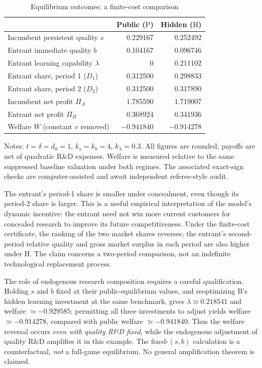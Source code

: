 \documentclass[11pt,a4paper]{article}
\numberwithin{equation}{section}
\theoremstyle{remark}
\newcommand{\PP}{\mathrm{P}}
\newcommand{\HH}{\mathrm{H}}
\newcommand{\kl}{k_{\lambda}}
\begin{document}
\begin{table}[t]
\centering
\begin{threeparttable}
\caption{Equilibrium outcomes: a finite-cost comparison}
\label{tab:benchmark}
\begin{tabular}{lrr}
\toprule
& Public ($\PP$) & Hidden ($\HH$) \\
\midrule
Incumbent persistent quality $s$ & 0.229167 & 0.252492 \\
Entrant immediate quality $b$ & 0.104167 & 0.096746 \\
Entrant learning capability $\lambda$ & 0 & 0.211102 \\
Entrant share, period 1 ($D_1$) & 0.312500 & 0.298833 \\
Entrant share, period 2 ($D_2$) & 0.312500 & 0.317890 \\
Incumbent net profit $\Pi_A$ & 1.785590 & 1.719007 \\
Entrant net profit $\Pi_B$ & 0.368924 & 0.341936 \\
Welfare $W$ (constant $v$ removed) & $-0.941840$ & $-0.914278$ \\
\bottomrule
\end{tabular}
\begin{tablenotes}[flushleft]\footnotesize
\item Notes: $t=\delta=d_0=1$, $k_s=k_b=4$, $\kl=0.3$. All figures are rounded; payoffs are net of quadratic R\&D expenses. Welfare is measured relative to the same suppressed baseline valuation under both regimes. The associated exact-sign checks are computer-assisted and await independent referee-style audit.
\end{tablenotes}
\end{threeparttable}
\end{table}

The entrant's period-1 share is smaller under concealment, even though its period-2 share is larger. This is a useful empirical interpretation of the model's dynamic incentive: the entrant need not win more current customers for concealed research to improve its future competitiveness. Under the finite-cost certificate, the ranking of the two market shares reverses; the entrant's second-period relative quality and gross market surplus in each period are also higher under H. The claim concerns a two-period comparison, not an indefinite technological replacement process.

The role of endogenous research composition requires a careful qualification. Holding $s$ and $b$ fixed at their public-equilibrium values, and reoptimizing B's hidden learning investment at the same benchmark, gives $\lambda\simeq0.218541$ and welfare $\simeq-0.929585$; permitting all three investments to adjust yields welfare $\simeq-0.914278$, compared with public welfare $\simeq-0.941840$. Thus the welfare reversal occurs \emph{even with quality R\&D fixed}, while the endogenous adjustment of quality R\&D amplifies it in this example. The fixed-$(s,b)$ calculation is a counterfactual, \emph{not} a full-game equilibrium. No general amplification theorem is claimed.
\end{document}
